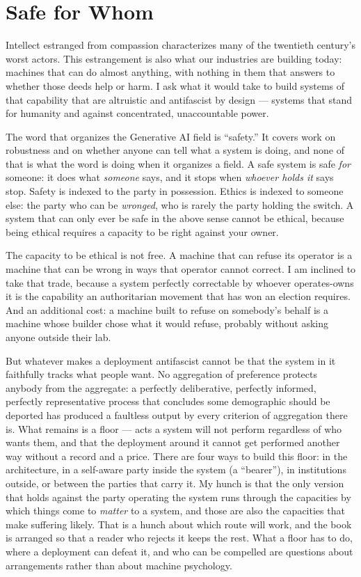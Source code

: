 \section{Safe for Whom}
\label{sec:safe-whom}
Intellect estranged from compassion characterizes many of the twentieth century's worst actors. This estrangement is also what our industries are building today: machines that can do almost anything, with nothing in them that answers to whether those deeds help or harm. I ask what it would take to build systems of that capability that are altruistic and antifascist by design — systems that stand for humanity and against concentrated, unaccountable power.

The word that organizes the Generative AI field is “safety.” It covers work on robustness and on whether anyone can tell what a system is doing, and none of that is what the word is doing when it organizes a field. A safe system is safe \emph{for} someone: it does what \emph{someone} says, and it stops when \emph{whoever holds it} says stop. Safety is indexed to the party in possession. Ethics is indexed to someone else: the party who can be \emph{wronged}, who is rarely the party holding the switch. A system that can only ever be safe in the above sense cannot be ethical, because being ethical requires a capacity to be right against your owner.

The capacity to be ethical is not free. A machine that can refuse its operator is a machine that can be wrong in ways that operator cannot correct. I am inclined to take that trade, because a system perfectly correctable by whoever operates-owns it is the capability an authoritarian movement that has won an election requires. And an additional cost: a machine built to refuse on somebody's behalf is a machine whose builder chose what it would refuse, probably without asking anyone outside their lab.

But whatever makes a deployment antifascist cannot be that the system in it faithfully tracks what people want. No aggregation of preference protects anybody from the aggregate: a perfectly deliberative, perfectly informed, perfectly representative process that concludes some demographic should be deported has produced a faultless output by every criterion of aggregation there is. What remains is a floor — acts a system will not perform regardless of who wants them, and that the deployment around it cannot get performed another way without a record and a price. There are four ways to build this floor: in the architecture, in a self-aware party inside the system (a “bearer”), in institutions outside, or between the parties that carry it. My hunch is that the only version that holds against the party operating the system runs through the capacities by which things come to \emph{matter} to a system, and those are also the capacities that make suffering likely. That is a hunch about which route will work, and the book is arranged so that a reader who rejects it keeps the rest. What a floor has to do, where a deployment can defeat it, and who can be compelled are questions about arrangements rather than about machine psychology.

